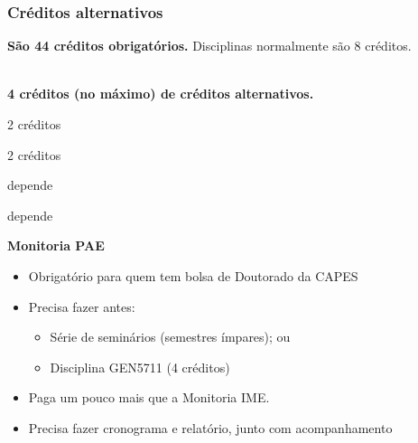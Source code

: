 \documentclass{beamer}
\begin{document}
\begin{frame}
  \frametitle{Créditos alternativos}
  \textbf{São 44 créditos obrigatórios.} Disciplinas normalmente são 8 créditos.\\~\\\pause

  \textbf{4 créditos (no máximo) de créditos alternativos.}
  \begin{multicols}{2}
  \begin{description}
    \item[Monitorias PAE:] 2 créditos
    \item[Artigos:] 2 créditos\columnbreak
    \item[Disciplinas USP:] depende
    \item[Cursos de verão:] depende
  \end{description}\pause
  \end{multicols}

  \textbf{Monitoria PAE}
  \begin{itemize}
    \item Obrigatório para quem tem bolsa de Doutorado da CAPES
    \item Precisa fazer antes:
      \begin{itemize}
        \item Série de seminários (semestres ímpares); ou
        \item Disciplina GEN5711 (4 créditos)
      \end{itemize}
    \item Paga um pouco mais que a Monitoria IME.
    \item Precisa fazer cronograma e relatório, junto com acompanhamento
  \end{itemize}
\end{frame}
\end{document}
